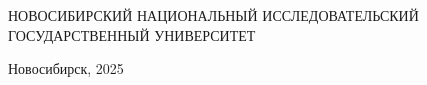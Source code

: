 \documentclass[fontsize=15pt]{scrartcl}
\begin{document}
\newpage
\begin{titlepage}

	\begin{center}	
			НОВОСИБИРСКИЙ НАЦИОНАЛЬНЫЙ
		ИССЛЕДОВАТЕЛЬСКИЙ ГОСУДАРСТВЕННЫЙ
			УНИВЕРСИТЕТ
	\end{center}


	\vfill
	\begin{center}
		Новосибирск, 2025
	\end{center}

\thispagestyle{empty}
\end{titlepage}



\end{document}
